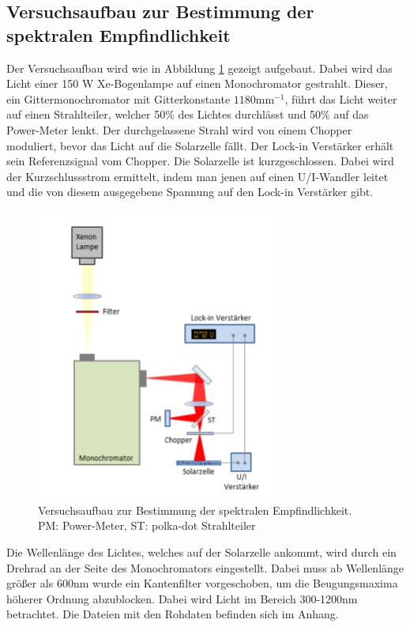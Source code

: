 
\subsection{Versuchsaufbau zur Bestimmung der spektralen Empfindlichkeit}



Der Versuchsaufbau wird wie in Abbildung \ref{Versuch1} gezeigt aufgebaut. Dabei wird das Licht einer 150 W Xe-Bogenlampe auf einen Monochromator gestrahlt. 
Dieser, ein Gittermonochromator mit Gitterkonstante $1180 \mathrm{mm}^{-1}$, führt das Licht weiter auf einen Strahlteiler, welcher 50\% des Lichtes 
durchlässt und 50\% auf das Power-Meter lenkt. Der durchgelassene Strahl wird von einem Chopper moduliert, bevor das Licht auf die Solarzelle 
fällt. Der Lock-in Verstärker erhält sein Referenzsignal vom Chopper. Die Solarzelle ist kurzgeschlossen. Dabei wird der Kurzschlussstrom ermittelt, indem 
man jenen auf einen U/I-Wandler leitet und die von diesem ausgegebene Spannung auf den Lock-in Verstärker gibt. 

\begin{figure}[ht]
    \captionsetup{justification=centering,margin=2cm}
    \centering
    \includegraphics[width =8cm]{Bilder/Versuchsaufbau1.png}
    \caption{Versuchsaufbau zur Bestimmung der spektralen
    Empfindlichkeit. PM: Power-Meter, ST: polka-dot Strahlteiler
    }
    \label{Versuch1}
\end{figure}

Die Wellenlänge des Lichtes, welches auf der Solarzelle ankommt, wird durch ein Drehrad an der Seite des Monochromators eingestellt. Dabei muss ab 
Wellenlänge größer als 600nm wurde ein Kantenfilter vorgeschoben, um die Beugungsmaxima höherer Ordnung abzublocken. Dabei wird 
Licht im Bereich 300-1200nm betrachtet. Die Dateien mit den Rohdaten befinden sich im Anhang.





